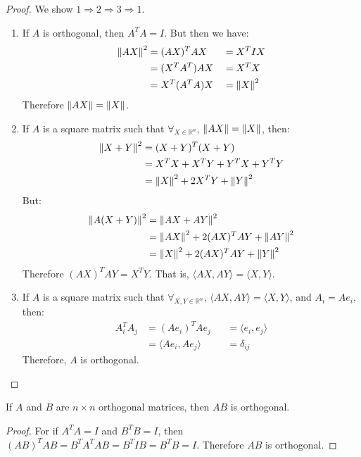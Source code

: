 \documentclass[../main.tex]{subfiles}
\begin{document}
\begin{proof}
We show $1\Rightarrow 2 \Rightarrow 3 \Rightarrow 1$.
\begin{enumerate}
\item If $A$ is orthogonal, then $A^TA = I$. But then we have:
        \begin{align*}
            \norm{AX}^{2} &= (AX)^{T}AX & &= X^{T}IX\\ 
            &= (X^{T}A^{T})AX & &= X^{T}X\\ 
            &= X^{T}(A^{T}A)X & &= \norm{X}^{2}
        \end{align*}
    Therefore $\norm{AX} = \norm{X}$.
\item If $A$ is a square matrix such that $\forall_{X\in\mathbb{R}^{n}}$, $\norm{AX} = \norm{X}$, then:
    \begin{align*}
        \norm{X+Y}^{2} &= (X+Y)^T(X+Y)\\
        &= X^TX+X^TY+Y^TX+Y^TY\\
        &= \norm{X}^2+2X^TY+\norm{Y}^2
    \end{align*}
    But:
    \begin{align*}
        \norm{A(X+Y)}^{2} &= \norm{AX+AY}^{2}\\
        &= \norm{AX}^{2}+2(AX)^{T}AY+\norm{AY}^2\\
        &= \norm{X}^{2}+2(AX)^{T}AY+\norm{Y}^2
    \end{align*}
    Therefore $(AX)^TAY = X^TY$. That is, $\langle AX, AY\rangle = \langle X, Y\rangle$.
    \item If $A$ is a square matrix such that $\forall_{X,Y\in \mathbb{R}^n}$, $\langle AX, AY\rangle = \langle X, Y\rangle$, and $A_i =  Ae_i$, then:
        \begin{align*}
            A_{i}^{T}A_{j} &= (Ae_{i})^{T}Ae_{j} & &= \langle e_i, e_j\rangle\\
            &= \langle Ae_{i}, Ae_{j}\rangle & &= \delta_{ij}
        \end{align*}
        Therefore, $A$ is orthogonal.
\end{enumerate}
\end{proof}
%
\begin{theorem}
If $A$ and $B$ are $n\times n$ orthogonal matrices, then $AB$ is orthogonal.
\end{theorem}
\begin{proof}
For if $A^{T}A = I$ and $B^{T}B = I$, then $(AB)^{T}AB = B^{T}A^{T}AB = B^{T}IB = B^{T}B = I$. Therefore $AB$ is orthogonal.
\end{proof}
\end{document}

